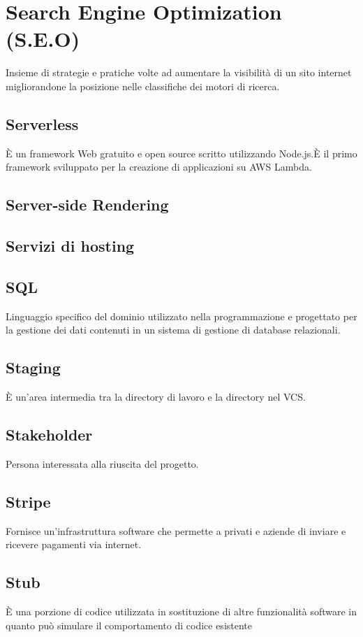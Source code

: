 \section{}
\section*{Search Engine Optimization (S.E.O)} Insieme di strategie e pratiche volte ad aumentare la visibilità di un sito internet migliorandone la posizione nelle classifiche dei motori di ricerca.
\subsection*{Serverless} È un framework Web gratuito e open source scritto utilizzando Node.js.È il primo framework sviluppato
per la creazione di applicazioni su AWS Lambda.

\subsection*{Server-side Rendering}

\subsection*{Servizi di hosting}

\subsection*{SQL} Linguaggio specifico del dominio utilizzato nella programmazione e progettato per la gestione dei dati
contenuti in un sistema di gestione di database relazionali.

\subsection*{Staging} È un'area intermedia tra la directory di lavoro e la directory nel VCS.

\subsection*{Stakeholder} Persona interessata alla riuscita del progetto.

\subsection*{Stripe} Fornisce un'infrastruttura software che permette a privati e aziende di inviare e ricevere pagamenti via internet.

\subsection*{Stub} È una porzione di codice utilizzata in sostituzione di altre funzionalità software in quanto può simulare il comportamento di codice esistente
\newpage